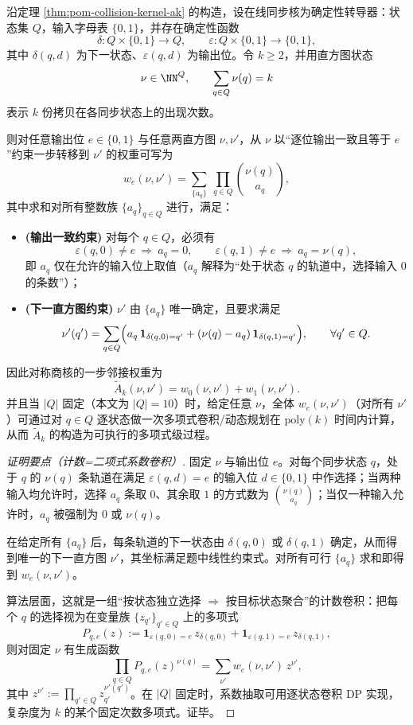 \begin{proposition}\label{prop:pom-ak-symmetric-transition-poly}
沿定理 \ref{thm:pom-collision-kernel-ak} 的构造，设在线同步核为确定性转导器：状态集 $Q$，输入字母表 $\{0,1\}$，并存在确定性函数
$$
\delta:Q\times\{0,1\}\to Q,\qquad \varepsilon:Q\times\{0,1\}\to\{0,1\},
$$
其中 $\delta(q,d)$ 为下一状态、$\varepsilon(q,d)$ 为输出位。令 $k\ge 2$，并用直方图状态
$$
\nu\in\NN^{Q},\qquad \sum_{q\in Q}\nu(q)=k
$$
表示 $k$ 份拷贝在各同步状态上的出现次数。

则对任意输出位 $e\in\{0,1\}$ 与任意两直方图 $\nu,\nu'$，从 $\nu$ 以“逐位输出一致且等于 $e$”约束一步转移到 $\nu'$ 的权重可写为
$$
w_e(\nu,\nu')
=
\sum_{\{a_q\}}
\ \prod_{q\in Q}\binom{\nu(q)}{a_q},
$$
其中求和对所有整数族 $\{a_q\}_{q\in Q}$ 进行，满足：
\begin{itemize}
  \item \textbf{(输出一致约束)} 对每个 $q\in Q$，必须有
  $$
  \varepsilon(q,0)\neq e\ \Rightarrow\ a_q=0,\qquad
  \varepsilon(q,1)\neq e\ \Rightarrow\ a_q=\nu(q),
  $$
  即 $a_q$ 仅在允许的输入位上取值（$a_q$ 解释为“处于状态 $q$ 的轨道中，选择输入 $0$ 的条数”）；
  \item \textbf{(下一直方图约束)} $\nu'$ 由 $\{a_q\}$ 唯一确定，且要求满足
  $$
  \nu'(q')
  =
  \sum_{q\in Q}\Bigl(
  a_q\,\mathbf{1}_{\delta(q,0)=q'}+(\nu(q)-a_q)\,\mathbf{1}_{\delta(q,1)=q'}
  \Bigr),
  \qquad \forall q'\in Q.
  $$
\end{itemize}
因此对称商核的一步邻接权重为
$$
\widetilde A_k(\nu,\nu')=w_0(\nu,\nu')+w_1(\nu,\nu').
$$
并且当 $|Q|$ 固定（本文为 $|Q|=10$）时，给定任意 $\nu$，全体 $w_e(\nu,\nu')$（对所有 $\nu'$）可通过对 $q\in Q$ 逐状态做一次多项式卷积/动态规划在 $\mathrm{poly}(k)$ 时间内计算，从而 \(\widetilde A_k\) 的构造为可执行的多项式级过程。
\end{proposition}
\begin{proof}[证明要点（计数=二项式系数卷积）]
固定 $\nu$ 与输出位 $e$。对每个同步状态 $q$，处于 $q$ 的 $\nu(q)$ 条轨道在满足 $\varepsilon(q,d)=e$ 的输入位 $d\in\{0,1\}$ 中作选择；当两种输入均允许时，选择 $a_q$ 条取 $0$、其余取 $1$ 的方式数为 $\binom{\nu(q)}{a_q}$；当仅一种输入允许时，$a_q$ 被强制为 $0$ 或 $\nu(q)$。

在给定所有 $\{a_q\}$ 后，每条轨道的下一状态由 $\delta(q,0)$ 或 $\delta(q,1)$ 确定，从而得到唯一的下一直方图 $\nu'$，其坐标满足题中线性约束式。对所有可行 $\{a_q\}$ 求和即得到 $w_e(\nu,\nu')$。

算法层面，这就是一组“按状态独立选择 $\Rightarrow$ 按目标状态聚合”的计数卷积：把每个 $q$ 的选择视为在变量族 $\{z_{q'}\}_{q'\in Q}$ 上的多项式
$$
P_{q,e}(z):=\mathbf{1}_{\varepsilon(q,0)=e}\,z_{\delta(q,0)}+\mathbf{1}_{\varepsilon(q,1)=e}\,z_{\delta(q,1)},
$$
则对固定 $\nu$ 有生成函数
$$
\prod_{q\in Q} P_{q,e}(z)^{\nu(q)}
=\sum_{\nu'} w_e(\nu,\nu')\,z^{\nu'},
$$
其中 $z^{\nu'}:=\prod_{q'\in Q} z_{q'}^{\nu'(q')}$。在 $|Q|$ 固定时，系数抽取可用逐状态卷积 DP 实现，复杂度为 $k$ 的某个固定次数多项式。证毕。
\end{proof}

